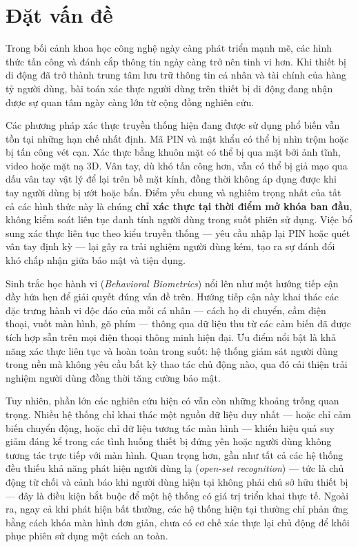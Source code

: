 \documentclass[../DoAn.tex]{subfiles}
\begin{document}
    \section{Đặt vấn đề}
    \label{sec:dvd}

    Trong bối cảnh khoa học công nghệ ngày càng phát triển mạnh mẽ, các hình thức tấn công và đánh cắp thông tin ngày càng trở nên tinh vi hơn. Khi thiết bị di động đã trở thành trung tâm lưu trữ thông tin cá nhân và tài chính của hàng tỷ người dùng, bài toán xác thực người dùng trên thiết bị di động đang nhận được sự quan tâm ngày càng lớn từ cộng đồng nghiên cứu.

    Các phương pháp xác thực truyền thống hiện đang được sử dụng phổ biến vẫn tồn tại những hạn chế nhất định. Mã PIN và mật khẩu có thể bị nhìn trộm hoặc bị tấn công vét cạn. Xác thực bằng khuôn mặt có thể bị qua mặt bởi ảnh tĩnh, video hoặc mặt nạ 3D. Vân tay, dù khó tấn công hơn, vẫn có thể bị giả mạo qua dấu vân tay vật lý để lại trên bề mặt kính, đồng thời không áp dụng được khi tay người dùng bị ướt hoặc bẩn. Điểm yếu chung và nghiêm trọng nhất của tất cả các hình thức này là chúng \textbf{chỉ xác thực tại thời điểm mở khóa ban đầu}, không kiểm soát liên tục danh tính người dùng trong suốt phiên sử dụng. Việc bổ sung xác thực liên tục theo kiểu truyền thống --- yêu cầu nhập lại PIN hoặc quét vân tay định kỳ --- lại gây ra trải nghiệm người dùng kém, tạo ra sự đánh đổi khó chấp nhận giữa bảo mật và tiện dụng.

    Sinh trắc học hành vi (\textit{Behavioral Biometrics}) nổi lên như một hướng tiếp cận đầy hứa hẹn để giải quyết đúng vấn đề trên. Hướng tiếp cận này khai thác các đặc trưng hành vi độc đáo của mỗi cá nhân --- cách họ di chuyển, cầm điện thoại, vuốt màn hình, gõ phím --- thông qua dữ liệu thu từ các cảm biến đã được tích hợp sẵn trên mọi điện thoại thông minh hiện đại. Ưu điểm nổi bật là khả năng xác thực liên tục và hoàn toàn trong suốt: hệ thống giám sát người dùng trong nền mà không yêu cầu bất kỳ thao tác chủ động nào, qua đó cải thiện trải nghiệm người dùng đồng thời tăng cường bảo mật.

    Tuy nhiên, phần lớn các nghiên cứu hiện có vẫn còn những khoảng trống quan trọng. Nhiều hệ thống chỉ khai thác một nguồn dữ liệu duy nhất --- hoặc chỉ cảm biến chuyển động, hoặc chỉ dữ liệu tương tác màn hình --- khiến hiệu quả suy giảm đáng kể trong các tình huống thiết bị đứng yên hoặc người dùng không tương tác trực tiếp với màn hình. Quan trọng hơn, gần như tất cả các hệ thống đều thiếu khả năng phát hiện người dùng lạ (\textit{open-set recognition}) --- tức là chủ động từ chối và cảnh báo khi người dùng hiện tại không phải chủ sở hữu thiết bị --- đây là điều kiện bắt buộc để một hệ thống có giá trị triển khai thực tế. Ngoài ra, ngay cả khi phát hiện bất thường, các hệ thống hiện tại thường chỉ phản ứng bằng cách khóa màn hình đơn giản, chưa có cơ chế xác thực lại chủ động để khôi phục phiên sử dụng một cách an toàn.
\end{document}
